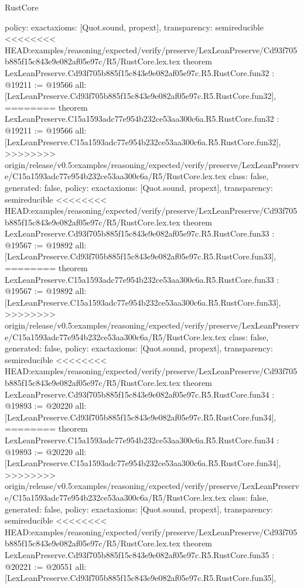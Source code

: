 \begin{lexlean}{RustCore}
\begin{coremodule}
{\begin{coremodule}
{{{{{{{{{{{{{{{{{{{{{{{{{{{{{{{{{{{  policy: exact{axioms: [Quot.sound, propext]},
  transparency: semireducible
}
<<<<<<<< HEAD:examples/reasoning/expected/verify/preserve/LexLeanPreserve/Cd93f705b885f15c843e9e082af05e97c/R5/RustCore.lex.tex
theorem LexLeanPreserve.Cd93f705b885f15c843e9e082af05e97c.R5.RustCore.fun32 : @19211 := @19566 {
  all: [LexLeanPreserve.Cd93f705b885f15c843e9e082af05e97c.R5.RustCore.fun32],
========
theorem LexLeanPreserve.C15a1593adc77e954b232ce53aa300c6a.R5.RustCore.fun32 : @19211 := @19566 {
  all: [LexLeanPreserve.C15a1593adc77e954b232ce53aa300c6a.R5.RustCore.fun32],
>>>>>>>> origin/release/v0.5:examples/reasoning/expected/verify/preserve/LexLeanPreserve/C15a1593adc77e954b232ce53aa300c6a/R5/RustCore.lex.tex
  class: false,
  generated: false,
  policy: exact{axioms: [Quot.sound, propext]},
  transparency: semireducible
}
<<<<<<<< HEAD:examples/reasoning/expected/verify/preserve/LexLeanPreserve/Cd93f705b885f15c843e9e082af05e97c/R5/RustCore.lex.tex
theorem LexLeanPreserve.Cd93f705b885f15c843e9e082af05e97c.R5.RustCore.fun33 : @19567 := @19892 {
  all: [LexLeanPreserve.Cd93f705b885f15c843e9e082af05e97c.R5.RustCore.fun33],
========
theorem LexLeanPreserve.C15a1593adc77e954b232ce53aa300c6a.R5.RustCore.fun33 : @19567 := @19892 {
  all: [LexLeanPreserve.C15a1593adc77e954b232ce53aa300c6a.R5.RustCore.fun33],
>>>>>>>> origin/release/v0.5:examples/reasoning/expected/verify/preserve/LexLeanPreserve/C15a1593adc77e954b232ce53aa300c6a/R5/RustCore.lex.tex
  class: false,
  generated: false,
  policy: exact{axioms: [Quot.sound, propext]},
  transparency: semireducible
}
<<<<<<<< HEAD:examples/reasoning/expected/verify/preserve/LexLeanPreserve/Cd93f705b885f15c843e9e082af05e97c/R5/RustCore.lex.tex
theorem LexLeanPreserve.Cd93f705b885f15c843e9e082af05e97c.R5.RustCore.fun34 : @19893 := @20220 {
  all: [LexLeanPreserve.Cd93f705b885f15c843e9e082af05e97c.R5.RustCore.fun34],
========
theorem LexLeanPreserve.C15a1593adc77e954b232ce53aa300c6a.R5.RustCore.fun34 : @19893 := @20220 {
  all: [LexLeanPreserve.C15a1593adc77e954b232ce53aa300c6a.R5.RustCore.fun34],
>>>>>>>> origin/release/v0.5:examples/reasoning/expected/verify/preserve/LexLeanPreserve/C15a1593adc77e954b232ce53aa300c6a/R5/RustCore.lex.tex
  class: false,
  generated: false,
  policy: exact{axioms: [Quot.sound, propext]},
  transparency: semireducible
}
<<<<<<<< HEAD:examples/reasoning/expected/verify/preserve/LexLeanPreserve/Cd93f705b885f15c843e9e082af05e97c/R5/RustCore.lex.tex
theorem LexLeanPreserve.Cd93f705b885f15c843e9e082af05e97c.R5.RustCore.fun35 : @20221 := @20551 {
  all: [LexLeanPreserve.Cd93f705b885f15c843e9e082af05e97c.R5.RustCore.fun35],
}}}}}}}}}}}}}}}}}}}}}}}}}}}}}}}}}}}}}}
\end{coremodule}}
\end{coremodule}
\end{lexlean}
